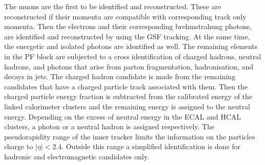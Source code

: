  The muons are the first to be identified and reconstructed. These are reconstructed if their momenta are compatible with corresponding track only momenta. Then the electrons and their corresponding brehmstrahung photons, are identified and reconstructed by using the GSF tracking. At the same time, the energetic and isolated photons are identified as well. The remaining elements in the PF block are subjected to a cross identification of charged hadrons, neutral hadrons, and photons that arise from parton fragmentation, hadronisation, and decays in jets. The charged hadron candidate is made from the remaining candidates that have a charged particle track associated with them. Then the charged particle energy fraction is subtracted from the calibrated energy of the linked calorimeter clusters and the remaining energy is assigned to the neutral energy. Depending on the excess of neutral energy in the ECAL and HCAL clusters, a photon or a neutral hadron is assigned respectively. The pseudorapidity range of the inner tracker limits the information on the particles charge to $|\eta| < 2.4$. Outside this range a simplified identification is done for hadronic and electromagnetic candidates only. 

